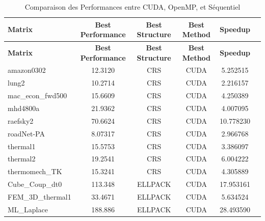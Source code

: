 \documentclass[12pt,oneside]{book} %
\begin{document}
\newpage
\begin{longtable}{lccccr}
    \caption{Comparaison des Performances entre CUDA, OpenMP, et Séquentiel}                                          \\
    \toprule
    \textbf{Matrix}   & \textbf{Best Performance} & \textbf{Best Structure} & \textbf{Best Method} & \textbf{Speedup} \\
    \midrule
    \endfirsthead
    \toprule
    \textbf{Matrix}   & \textbf{Best Performance} & \textbf{Best Structure} & \textbf{Best Method} & \textbf{Speedup} \\
    \midrule
    \endhead
    \bottomrule
    \endfoot
    amazon0302        & 12.3120                   & CRS                     & CUDA                 & 5.252515         \\
    lung2             & 10.2714                   & CRS                     & CUDA                 & 2.216157         \\
    mac\_econ\_fwd500 & 15.6609                   & CRS                     & CUDA                 & 4.250389         \\
    mhd4800a          & 21.9362                   & CRS                     & CUDA                 & 4.007095         \\
    raefsky2          & 70.6624                   & CRS                     & CUDA                 & 10.778230        \\
    roadNet-PA        & 8.07317                   & CRS                     & CUDA                 & 2.966768         \\
    thermal1          & 15.5753                   & CRS                     & CUDA                 & 3.386097         \\
    thermal2          & 19.2541                   & CRS                     & CUDA                 & 6.004222         \\
    thermomech\_TK    & 15.3241                   & CRS                     & CUDA                 & 4.305889         \\
    Cube\_Coup\_dt0   & 113.348                   & ELLPACK                 & CUDA                 & 17.953161        \\
    FEM\_3D\_thermal1 & 33.4671                   & ELLPACK                 & CUDA                 & 5.634524         \\
    ML\_Laplace       & 188.886                   & ELLPACK                 & CUDA                 & 28.493590        \\

\end{longtable}
\end{document}
